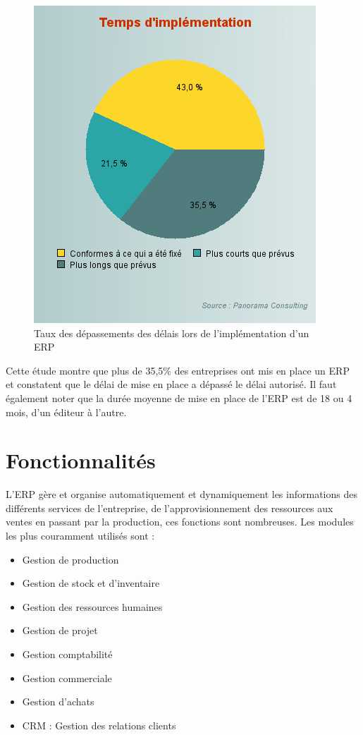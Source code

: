 \begin{figure}[H]
    \centering
    \includegraphics[scale=0.65]{ERP/graph-taux-implementation.png}
    \caption{Taux des dépassements des délais lors de l’implémentation d’un ERP}
\end{figure} 

Cette étude montre que plus de 35,5\% des entreprises ont mis en place un \acs{ERP} et constatent que le délai de mise en place a dépassé le délai autorisé. Il faut également noter que la durée moyenne de mise en place de l'\acs{ERP} est de 18 ou 4 mois, d'un éditeur à l'autre.\\

\section{Fonctionnalités\cite{funcs}}
L'ERP gère et organise automatiquement et dynamiquement les informations des différents services de l'entreprise, de l'approvisionnement des ressources aux ventes en passant par la production, ces fonctions sont nombreuses. Les modules les plus couramment utilisés sont :\\

\begin{itemize}
    \item Gestion de production
    \item Gestion de stock et d’inventaire
    \item Gestion des ressources humaines 
    \item Gestion de projet
    \item Gestion comptabilité
    \item Gestion commerciale
    \item Gestion d’achats
    \item CRM : Gestion des relations clients\\
\end{itemize}

